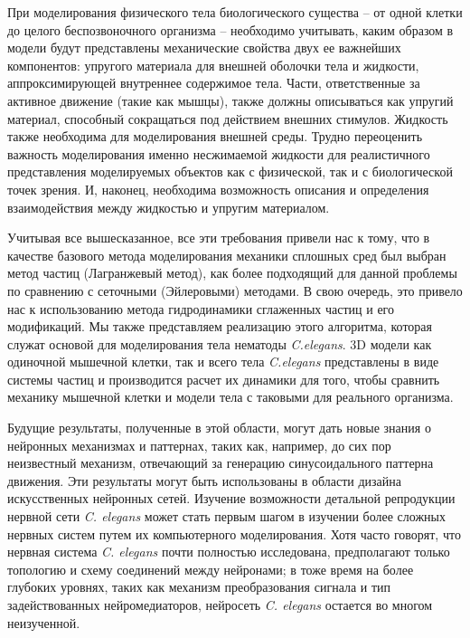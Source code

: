 При моделирования физического тела биологического существа – от одной клетки до целого беспозвоночного организма – необходимо учитывать, каким образом в модели будут представлены механические свойства двух ее важнейших компонентов: упругого материала для внешней оболочки тела и жидкости, аппроксимирующей внутреннее содержимое тела. Части, ответственные за активное движение (такие как мышцы), также должны описываться как упругий материал, способный сокращаться под действием внешних стимулов. Жидкость также необходима для моделирования внешней среды. Трудно переоценить важность моделирования именно несжимаемой жидкости для реалистичного представления моделируемых объектов как с физической, так и с биологической точек зрения. И, наконец, необходима возможность описания и определения  взаимодействия между жидкостью и упругим материалом.

Учитывая все вышесказанное, все эти требования привели нас к тому, что в качестве базового метода моделирования механики сплошных сред был выбран метод частиц (Лагранжевый метод), как более подходящий для данной проблемы по сравнению с сеточными (Эйлеровыми) методами.  В свою очередь, это привело нас к использованию метода гидродинамики сглаженных частиц и его модификаций. Мы также представляем реализацию этого алгоритма, которая служат основой для моделирования тела нематоды \textit{C.elegans}. 3D модели как одиночной мышечной клетки, так и всего тела \textit{C.elegans} представлены в виде системы частиц и производится расчет их динамики для того, чтобы сравнить  механику мышечной клетки и модели тела с таковыми для реального организма.

Будущие результаты, полученные в этой области, могут дать новые знания о нейронных механизмах и паттернах, таких как, например, до сих пор неизвестный механизм, отвечающий за генерацию синусоидального паттерна движения. Эти результаты могут быть использованы в области дизайна искусственных нейронных сетей. Изучение возможности детальной репродукции нервной сети \textit{C. elegans} может стать  первым шагом в изучении более сложных нервных систем путем их компьютерного моделирования. Хотя часто говорят, что нервная система \textit{C. elegans} почти полностью исследована, предполагают только топологию и схему соединений между нейронами; в тоже время на более глубоких уровнях, таких как механизм преобразования сигнала и тип задействованных нейромедиаторов, нейросеть \textit{C. elegans} остается во многом неизученной.

